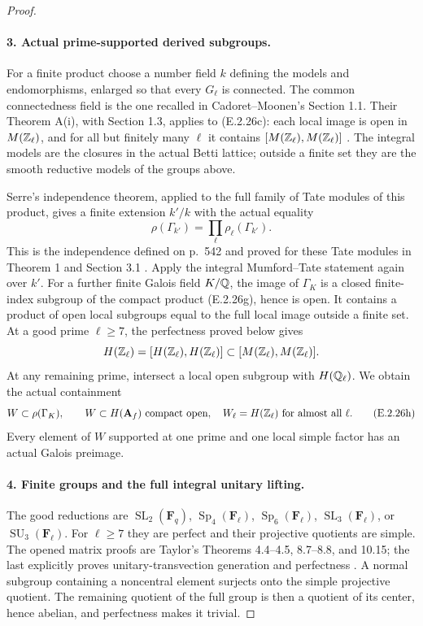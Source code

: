 \begin{proof}
\paragraph{3. Actual prime-supported derived subgroups.}
For a finite product choose a number field \(k\) defining
the models and endomorphisms, enlarged so that every
\(G_\ell\) is connected. The common connectedness field is
the one recalled in Cadoret--Moonen's Section 1.1.
Their Theorem A(i), with Section 1.3, applies to (E.2.26c):
each local image is open in \(M(\mathbb Z_\ell)\), and for all
but finitely many \(\ell\) it contains
\([M(\mathbb Z_\ell),M(\mathbb Z_\ell)]\)
\cite[Theorem A(i), Sections 1.1--1.3]{GenCadoretMoonen2020}.
The integral models are the closures in the actual Betti
lattice; outside a finite set they are the smooth reductive
models of the groups above.

Serre's independence theorem, applied to the full family of
Tate modules of this product, gives a finite extension \(k'/k\)
with the actual equality
\[
 \rho(\Gamma_{k'})=\prod_\ell\rho_\ell(\Gamma_{k'}).
 \tag{E.2.26g}
\]
This is the independence defined on p.~542 and proved for
these Tate modules in Theorem 1 and Section 3.1
\cite[pp.~542--545]{GenSerreIndependence2013}.
Apply the integral Mumford--Tate statement again over \(k'\).
For a further finite Galois field \(K/\mathbb Q\), the image of
\(\Gamma_K\) is a closed finite-index subgroup of the compact
product (E.2.26g), hence is open. It contains a product of open
local subgroups equal to the full local image outside a finite
set. At a good prime \(\ell\geq7\), the perfectness proved
below gives
\[
 H(\mathbb Z_\ell)=[H(\mathbb Z_\ell),H(\mathbb Z_\ell)]
       \subset[M(\mathbb Z_\ell),M(\mathbb Z_\ell)].
\]
At any remaining prime, intersect a local open subgroup with
\(H(\mathbb Q_\ell)\). We obtain the actual containment
\[
 W\subset\rho(\Gamma_K),\qquad
 W\subset H(\mathbf A_f)\text{ compact open},
 \quad W_\ell=H(\mathbb Z_\ell)\text{ for almost all }\ell.
 \tag{E.2.26h}
\]
Every element of \(W\) supported at one prime and one local
simple factor has an actual Galois preimage.

\paragraph{4. Finite groups and the full integral unitary lifting.}
The good reductions are
\(\operatorname{SL}_2(\mathbf F_q)\),
\(\operatorname{Sp}_4(\mathbf F_\ell)\),
\(\operatorname{Sp}_6(\mathbf F_\ell)\),
\(\operatorname{SL}_3(\mathbf F_\ell)\), or
\(\operatorname{SU}_3(\mathbf F_\ell)\).
For \(\ell\geq7\) they are perfect and their projective
quotients are simple. The opened matrix proofs are Taylor's
Theorems 4.4--4.5, 8.7--8.8, and 10.15; the last explicitly
proves unitary-transvection generation and perfectness
\cite[pp.~22--23, 72--74, 122--123]{GenTaylorClassical2021}.
A normal subgroup containing a noncentral element surjects
onto the simple projective quotient. The remaining quotient
of the full group is then a quotient of its center, hence
abelian, and perfectness makes it trivial.


\end{proof}
